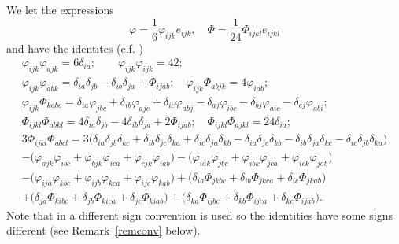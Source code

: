 \documentclass[10pt,british]{article}
\def\p{{\varphi}}
\def\ph{{\Phi}}
\begin{document}
We let the expressions 
$$
 \p=\frac16\p_{ijk}e_{ijk}, \quad  \ph=\frac1{24}\ph_{ijkl}e_{ijkl}
$$
and have the  identites (c.f. \cite{Br1,Kar1,Kar})
\begin{equation}\label{iden}
\begin{split}
\p_{ijk}\p_{ajk}=6\delta_{ia};\qquad \p_{ijk}\p_{ijk}=42;\\
 \p_{ijk}\p_{abk}=\delta_{ia}\delta_{jb}-\delta_{ib}\delta_{ja}+\ph_{ijab};\quad
\p_{ijk}\ph_{abjk}=4\p_{iab};\\
\p_{ijk}\ph_{kabc}=\delta_{ia}\p_{jbc}+\delta_{ib}\p_{ajc}+\delta_{ic}\p_{abj}-\delta_{aj}\p_{ibc}-\delta_{bj}\p_{aic}-\delta_{cj}\p_{abi};\\
\ph_{ijkl}\ph_{abkl}=4\delta_{ia}\delta_{jb}-4\delta_{ib}\delta_{ja}+2\ph_{ijab};\quad \ph_{ijkl}\ph_{ajkl}=24\delta_{ia};\\
3\ph_{ijkl}\ph_{abcl}=3\big(\delta_{ia}\delta_{jb}\delta_{kc}+\delta_{ib}\delta_{jc}\delta_{ka}+\delta_{ic}\delta_{ja}\delta_{kb}
-\delta_{ia}\delta_{jc}\delta_{kb}-\delta_{ib}\delta_{ja}\delta_{kc}-\delta_{ic}\delta_{jb}\delta_{ka}\big)\\
-\big(\p_{ajk}\p_{ibc}+\p_{bjk}\p_{ica}+\p_{cjk}\p_{iab}\big)
-\big(\p_{iak}\p_{jbc}+\p_{ibk}\p_{jca}+\p_{ick}\p_{jab}  \big)\\
-\big(\p_{ija}\p_{kbc}+\p_{ijb}\p_{kca}+\p_{ijc}\p_{kab}  \big)
+\big(\delta_{ia}\ph_{jkbc}+\delta_{ib}\ph_{jkca}+\delta_{ic}\ph_{jkab}  \big)\\
+\big( \delta_{ja}\ph_{kibc}+\delta_{jb}\ph_{kica}+\delta_{jc}\ph_{kiab} \big)
+\big( \delta_{ka}\ph_{ijbc}+\delta_{kb}\ph_{ijca}+\delta_{kc}\ph_{ijab} \big).
\end{split}
\end{equation}
Note that in \cite{Kar} a different sign convention is used so the identities have
some signs different (see Remark~\ref{remconv} below).
\end{document}
